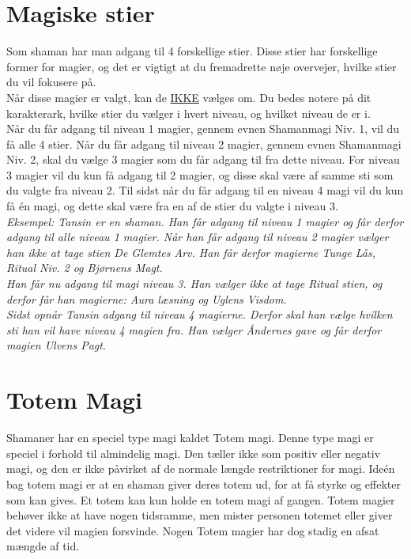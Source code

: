 \section*{Magiske stier}
Som shaman har man adgang til 4 forskellige stier. Disse stier har forskellige former for magier, og det er vigtigt at du fremadrette nøje overvejer, hvilke stier du vil fokusere på.\\
Når disse magier er valgt, kan de \underline{IKKE} vælges om. Du bedes notere på dit karakterark, hvilke stier du vælger i hvert niveau, og hvilket niveau de er i.\\
Når du får adgang til niveau 1 magier, gennem evnen Shamanmagi Niv. 1, vil du få alle 4 stier. Når du får adgang til niveau 2 magier, gennem evnen Shamanmagi Niv. 2, skal du vælge 3 magier som du får adgang til fra dette niveau. For niveau 3 magier vil du kun få adgang til 2 magier, og disse skal være af samme sti som du valgte fra niveau 2. Til sidst når du får adgang til en niveau 4 magi vil du kun få én magi, og dette skal være fra en af de stier du valgte i niveau 3. \\
\textit{Eksempel: Tansin er en shaman. Han får adgang til niveau 1 magier og får derfor adgang til alle niveau 1 magier. Når han får adgang til niveau 2 magier vælger han ikke at tage stien De Glemtes Arv. Han får derfor magierne Tunge Lås, Ritual Niv. 2 og Bjørnens Magt.\\
Han får nu adgang til magi niveau 3. Han vælger ikke at tage Ritual stien, og derfor får han magierne: Aura læsning og Uglens Visdom.\\
Sidst opnår Tansin adgang til niveau 4 magierne. Derfor skal han vælge hvilken sti han vil have niveau 4 magien fra. Han vælger Åndernes gave og får derfor magien Ulvens Pagt.\\}

\section*{Totem Magi}
Shamaner har en speciel type magi kaldet Totem magi. Denne type magi er speciel i forhold til almindelig magi. Den tæller ikke som positiv eller negativ magi, og den er ikke påvirket af de normale længde restriktioner for magi. Ideén bag totem magi er at en shaman giver deres totem ud, for at få styrke og effekter som kan gives. Et totem kan kun holde en totem magi af gangen. Totem magier behøver ikke at have nogen tidsramme, men mister personen totemet eller giver det videre vil magien forsvinde. Nogen Totem magier har dog stadig en afsat mængde af tid.


